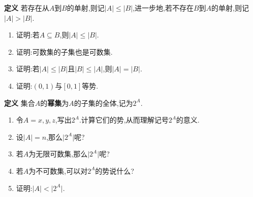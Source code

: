 \documentclass[
  a4paper,
]{ctexart}
\providecommand{\tightlist}{\setlength{\itemsep}{0pt}\setlength{\parskip}{0pt}}
\begin{document}
\textbf{定义}
若存在从\(A\)到\(B\)的单射,则记\(\vert A \rvert \leq \vert B \rvert\),进一步地,若不存在\(B\)到\(A\)的单射,则记\(\vert A \rvert > \vert B \rvert\).

\begin{enumerate}
\def\labelenumi{\arabic{enumi}.}
\setcounter{enumi}{10}
\tightlist
\item
  证明:若\(A \subseteq B\),则\(\vert A \rvert \leq \vert B \rvert\).
\item
  证明:可数集的子集也是可数集.
\item
  证明:若\(\vert A \rvert \leq \vert B \rvert\)且\(\vert B \rvert \leq \vert A \rvert\),则\(\vert A \rvert = \vert B \rvert\).
\item
  证明:\((0,1)\)与\([0,1]\)等势.
\end{enumerate}

\textbf{定义} 集合\(A\)的\textbf{幂集}为\(A\)的子集的全体,记为\(2^A\).

\begin{enumerate}
\def\labelenumi{\arabic{enumi}.}
\setcounter{enumi}{14}
\tightlist
\item
  令\(A={x,y,z}\),写出\(2^A\).计算它们的势,从而理解记号\(2^A\)的意义.
\item
  设\(\vert A \rvert = n\),那么\(\vert 2^A \rvert\)呢?
\item
  若\(A\)为无限可数集,那么\(\vert 2^A \rvert\)呢?
\item
  若\(A\)为不可数集,可以对\(2^A\)的势说什么?
\item
  证明:\(\vert A \rvert < \vert 2^A \rvert\).
\end{enumerate}
\end{document}
